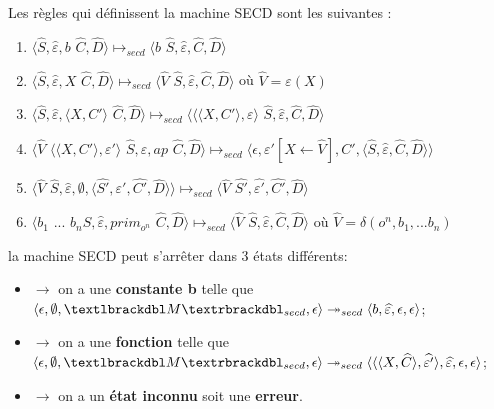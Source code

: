 \documentclass[10pt,a4paper]{report}
\begin{document}
Les règles qui définissent la machine SECD sont les suivantes :
\smallbreak
\begin{enumerate}
\item $\langle\widehat{S},\widehat{\varepsilon},b$ $\widehat{C},\widehat{D}\rangle \longmapsto_{secd} \langle b$ $\widehat{S},\widehat{\varepsilon},\widehat{C},\widehat{D}\rangle$
\item $\langle\widehat{S},\widehat{\varepsilon},X$ $\widehat{C},\widehat{D}\rangle \longmapsto_{secd} \langle \widehat{V}$ $\widehat{S},\widehat{\varepsilon},\widehat{C},\widehat{D}\rangle$ où $\widehat{V} = \varepsilon(X)$
\item $\langle\widehat{S},\widehat{\varepsilon},\langle X,C'\rangle$ $\widehat{C},\widehat{D}\rangle \longmapsto_{secd} \langle\langle\langle X,C'\rangle,\varepsilon\rangle$ $\widehat{S},\widehat{\varepsilon},\widehat{C},\widehat{D}\rangle$
\item $\langle\widehat{V}$ $\langle\langle X,C'\rangle,\varepsilon'\rangle$ $\widehat{S},\widehat{\varepsilon},ap$ $\widehat{C},\widehat{D}\rangle \longmapsto_{secd} \langle\epsilon,\varepsilon'[X \leftarrow \widehat{V}],C',\langle\widehat{S},\widehat{\varepsilon},\widehat{C},\widehat{D}\rangle\rangle$
\item $\langle\widehat{V}$ $\widehat{S},\widehat{\varepsilon},\emptyset,\langle\widehat{S'},\widehat{\varepsilon'},\widehat{C'},\widehat{D}\rangle\rangle \longmapsto_{secd} \langle \widehat{V}$ $\widehat{S'},\widehat{\varepsilon'},\widehat{C'},\widehat{D}\rangle$
\item $\langle b_{1}$ $...$ $b_{n}\widehat{S},\widehat{\varepsilon},prim_{o^{n}}$ $\widehat{C},\widehat{D}\rangle \longmapsto_{secd} \langle \widehat{V}$ $\widehat{S},\widehat{\varepsilon},\widehat{C},\widehat{D}\rangle$ où $\widehat{V} = \delta(o^{n},b_1,...b_{n})$
\end{enumerate}
\bigbreak


la machine SECD peut s'arrêter dans 3 états différents:
\begin{itemize}
\item[]$\longrightarrow$ on a une \textbf{constante b} telle que $\langle \epsilon,\emptyset,\textlbrackdbl M\textrbrackdbl_{secd},\epsilon\rangle \twoheadrightarrow_{secd} \langle b,\widehat{\varepsilon},\epsilon,\epsilon\rangle$;
\item[]$\longrightarrow$ on a une \textbf{fonction} telle que $\langle \epsilon,\emptyset,\textlbrackdbl M\textrbrackdbl_{secd},\epsilon\rangle \twoheadrightarrow_{secd} \langle\langle\langle X,\widehat{C}\rangle,\widehat{\varepsilon'}\rangle,\widehat{\varepsilon},\epsilon,\epsilon\rangle$;
\item[]$\longrightarrow$ on a un \textbf{état inconnu} soit une \textbf{erreur}.
\end{itemize}
\bigbreak
\end{document}

